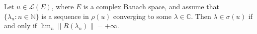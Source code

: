 Let $u \in \mathcal{L}(E)$, where $E$ is a complex Banach space, and assume that $\{\lambda_n : n \in \mathbb{N}\}$ is a sequence in $\rho(u)$ converging to some $\lambda \in \mathbb{C}$. Then $\lambda \in \sigma(u)$ if and only if $\lim_n \|R(\lambda_n)\| = +\infty$.

